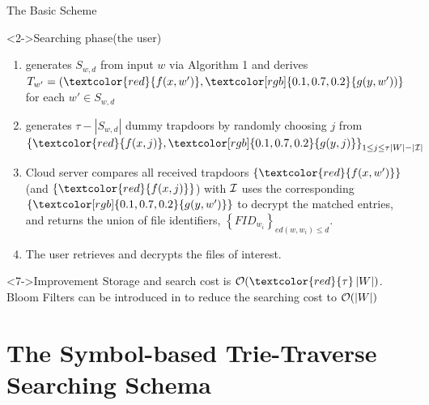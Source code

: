 \documentclass[handout]{beamer}
\begin{document}
\begin{frame}{The Basic Scheme}
	\begin{alertblock}<2->{Searching phase(the user)}
		\begin{enumerate}
			\item<3-> generates ${{S_{w,d}}}$ from input $w$ via Algorithm 1 and derives ${T_{w'}} = (\textcolor{red}{f(x,w')},\textcolor[rgb]{0.1,0.7,0.2}{g(y,w'))}$ for each $w' \in {S_{w,d}}$
			\item<4-> generates $\tau  - \left| {{S_{w,d}}} \right|$ dummy trapdoors by randomly choosing $j$ from ${\left\{ {\textcolor{red}{f(x,j)},\textcolor[rgb]{0.1,0.7,0.2}{g(y,j)}} \right\}_{1 \le j \le \tau \left| W \right| - \left| {\cal I} \right|}}$
			\item<5-> Cloud server compares all received trapdoors $\left\{ \textcolor{red}{f(x,w')} \right\}$(and $\left\{ \textcolor{red}{f(x,j)} \right\}$) with ${\cal I}$ uses the corresponding $\left\{ \textcolor[rgb]{0.1,0.7,0.2}{g(y,w')} \right\}$ to decrypt the matched entries,  and returns the union of file identifiers, ${\left\{ {FI{D_{{w_i}}}} \right\}_{ed(w,{w_i}) \le d}}$.
			\item<6-> The user retrieves and decrypts the files of interest.
		\end{enumerate}
	\end{alertblock}
	\begin{block}<7->{Improvement}
		Storage and search cost is ${\cal O}(\textcolor{red}{\tau} \left| W \right|)$.\\
		Bloom Filters can be introduced in to reduce the searching cost to  ${\cal O}( \left| W \right|)$
	\end{block}
\end{frame}

\section{The Symbol-based Trie-Traverse Searching Schema}
\end{document}
